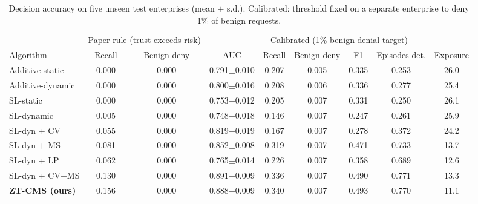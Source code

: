\begin{table}[t]\caption{Decision accuracy on five unseen test enterprises (mean $\pm$ s.d.). Calibrated: threshold fixed on a separate enterprise to deny 1\% of benign requests.}\label{tab:acc}\centering\small\setlength{\tabcolsep}{4pt}
\begin{tabular}{lcccccccc}\toprule
 & \multicolumn{2}{c}{Paper rule (trust exceeds risk)} & \multicolumn{6}{c}{Calibrated (1\% benign denial target)}\\\cmidrule(lr){2-3}\cmidrule(lr){4-9}
Algorithm & Recall & Benign deny & AUC & Recall & Benign deny & F1 & Episodes det. & Exposure\\\midrule
Additive-static & 0.000 & 0.000 & 0.791$\pm$0.010 & 0.207 & 0.005 & 0.335 & 0.253 & 26.0\\
Additive-dynamic & 0.000 & 0.000 & 0.800$\pm$0.016 & 0.208 & 0.006 & 0.336 & 0.277 & 25.4\\
\midrule
SL-static & 0.000 & 0.000 & 0.753$\pm$0.012 & 0.205 & 0.007 & 0.331 & 0.250 & 26.1\\
SL-dynamic & 0.005 & 0.000 & 0.748$\pm$0.018 & 0.146 & 0.007 & 0.247 & 0.261 & 25.9\\
\midrule
SL-dyn + CV & 0.055 & 0.000 & 0.819$\pm$0.019 & 0.167 & 0.007 & 0.278 & 0.372 & 24.2\\
SL-dyn + MS & 0.081 & 0.000 & 0.852$\pm$0.008 & 0.319 & 0.007 & 0.471 & 0.733 & 13.7\\
SL-dyn + LP & 0.062 & 0.000 & 0.765$\pm$0.014 & 0.226 & 0.007 & 0.358 & 0.689 & 12.6\\
SL-dyn + CV+MS & 0.130 & 0.000 & 0.891$\pm$0.009 & 0.336 & 0.007 & 0.490 & 0.771 & 13.3\\
\midrule
\textbf{ZT-CMS (ours)} & 0.156 & 0.000 & 0.888$\pm$0.009 & 0.340 & 0.007 & 0.493 & 0.770 & 11.1\\
\bottomrule\end{tabular}\end{table}
